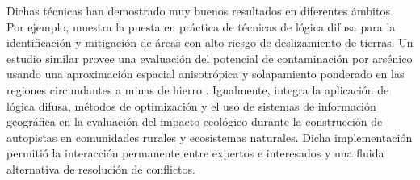 Dichas técnicas han demostrado muy buenos resultados en diferentes ámbitos.  Por ejemplo, \cite{feizizadeh_gis-based_2014} muestra la puesta en práctica de 
técnicas de lógica difusa para la identificación y mitigación de áreas con alto riesgo de deslizamiento de tierras.  Un estudio similar provee una evaluación 
del potencial de contaminación por arsénico usando una aproximación espacial anisotrópica y solapamiento ponderado en las regiones circundantes a minas de 
hierro \cite{weerasiri_assessment_2014}.  Igualmente, \cite{bojorquez-tapia_integrating_2002} integra la aplicación de lógica difusa, métodos de optimización y 
el uso de sistemas de información geográfica en la evaluación del impacto ecológico durante la construcción de autopistas en comunidades rurales y ecosistemas 
naturales.  Dicha implementación permitió la interacción permanente entre expertos e interesados y una fluida alternativa de resolución de conflictos.


